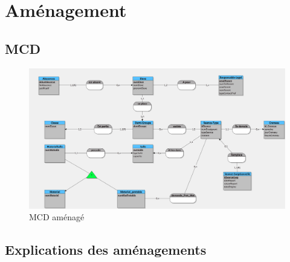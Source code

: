 \documentclass[12pt,french,titlepage]{article}
\begin{document}
    \section{Aménagement}
    
    \subsection{MCD}
    
    \begin{figure}[H]
	      \centering
	      \includegraphics[scale=0.1]{./mcd_amenage.jpg}
	      \caption{MCD aménagé}
	      
	   
	      
	  \end{figure}
	  
	  \subsection{Explications des aménagements}
	  
\end{document}
